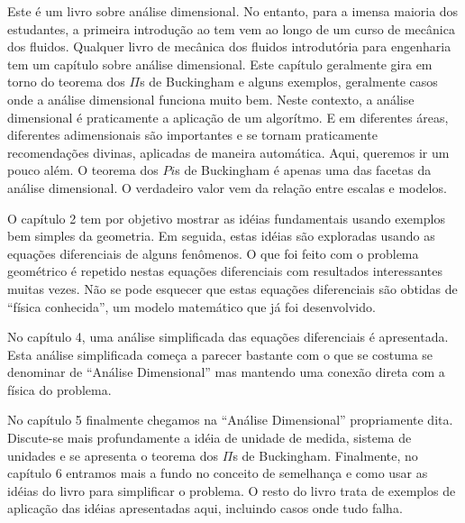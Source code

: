 Este é um livro sobre análise dimensional. No entanto, para a imensa maioria dos estudantes, a primeira introdução ao tem vem ao longo de um curso de mecânica dos fluidos. Qualquer livro de mecânica dos fluidos introdutória para engenharia tem um capítulo sobre análise dimensional. Este capítulo geralmente gira em torno do teorema dos $\Pi$s de Buckingham e alguns exemplos, geralmente casos onde a análise dimensional funciona muito bem. Neste contexto, a análise dimensional é praticamente a aplicação de um algorítmo. E em diferentes áreas, diferentes adimensionais são importantes  e se tornam praticamente recomendações divinas, aplicadas de maneira automática. Aqui, queremos ir um pouco além. O teorema dos $Pi$s de Buckingham é apenas uma das facetas da análise dimensional. O verdadeiro valor vem da relação entre escalas e modelos.

O capítulo 2 tem por objetivo mostrar as idéias fundamentais usando exemplos bem simples da geometria. Em seguida, estas idéias são exploradas usando as equações diferenciais de alguns fenômenos. O que foi feito com o problema geométrico é repetido nestas equações diferenciais com resultados interessantes muitas vezes. Não se pode esquecer que estas equações diferenciais são obtidas de ``física conhecida'', um modelo matemático que já foi desenvolvido.

No capítulo 4, uma análise simplificada das equações diferenciais é apresentada. Esta análise simplificada começa a parecer bastante com o que se costuma se denominar de ``Análise Dimensional'' mas mantendo uma conexão direta com a física do problema.

No capítulo 5 finalmente chegamos na ``Análise Dimensional'' propriamente dita. Discute-se mais profundamente a idéia de unidade de medida, sistema de unidades e se apresenta o teorema dos $\Pi$s de Buckingham. Finalmente, no capítulo 6 entramos mais a fundo no conceito de semelhança e como usar as idéias do livro para simplificar o problema. O resto do livro trata de exemplos de aplicação das idéias apresentadas aqui, incluindo casos onde tudo falha.



